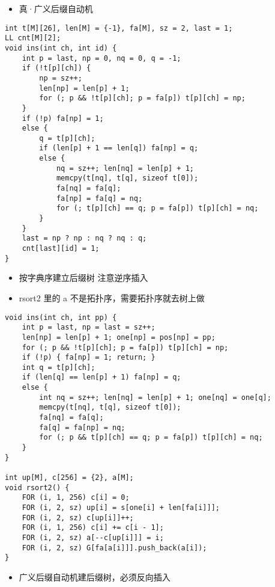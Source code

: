 \documentclass[]{article}
\providecommand{\tightlist}{%
  \setlength{\itemsep}{0pt}\setlength{\parskip}{0pt}}
\begin{document}
\begin{itemize}
\tightlist
\item
  真·广义后缀自动机
\end{itemize}

\begin{verbatim}
int t[M][26], len[M] = {-1}, fa[M], sz = 2, last = 1;
LL cnt[M][2];
void ins(int ch, int id) {
    int p = last, np = 0, nq = 0, q = -1;
    if (!t[p][ch]) {
        np = sz++;
        len[np] = len[p] + 1;
        for (; p && !t[p][ch]; p = fa[p]) t[p][ch] = np;
    }
    if (!p) fa[np] = 1;
    else {
        q = t[p][ch];
        if (len[p] + 1 == len[q]) fa[np] = q;
        else {
            nq = sz++; len[nq] = len[p] + 1;
            memcpy(t[nq], t[q], sizeof t[0]);
            fa[nq] = fa[q];
            fa[np] = fa[q] = nq;
            for (; t[p][ch] == q; p = fa[p]) t[p][ch] = nq;
        }
    }
    last = np ? np : nq ? nq : q;
    cnt[last][id] = 1;
}
\end{verbatim}

\begin{itemize}
\tightlist
\item
  按字典序建立后缀树 注意逆序插入
\item
  rsort2 里的 a 不是拓扑序，需要拓扑序就去树上做
\end{itemize}

\begin{verbatim}
void ins(int ch, int pp) {
    int p = last, np = last = sz++;
    len[np] = len[p] + 1; one[np] = pos[np] = pp;
    for (; p && !t[p][ch]; p = fa[p]) t[p][ch] = np;
    if (!p) { fa[np] = 1; return; }
    int q = t[p][ch];
    if (len[q] == len[p] + 1) fa[np] = q;
    else {
        int nq = sz++; len[nq] = len[p] + 1; one[nq] = one[q];
        memcpy(t[nq], t[q], sizeof t[0]);
        fa[nq] = fa[q];
        fa[q] = fa[np] = nq;
        for (; p && t[p][ch] == q; p = fa[p]) t[p][ch] = nq;
    }
}

int up[M], c[256] = {2}, a[M];
void rsort2() {
    FOR (i, 1, 256) c[i] = 0;
    FOR (i, 2, sz) up[i] = s[one[i] + len[fa[i]]];
    FOR (i, 2, sz) c[up[i]]++;
    FOR (i, 1, 256) c[i] += c[i - 1];
    FOR (i, 2, sz) a[--c[up[i]]] = i;
    FOR (i, 2, sz) G[fa[a[i]]].push_back(a[i]);
}
\end{verbatim}

\begin{itemize}
\tightlist
\item
  广义后缀自动机建后缀树，必须反向插入
\end{itemize}
\end{document}
